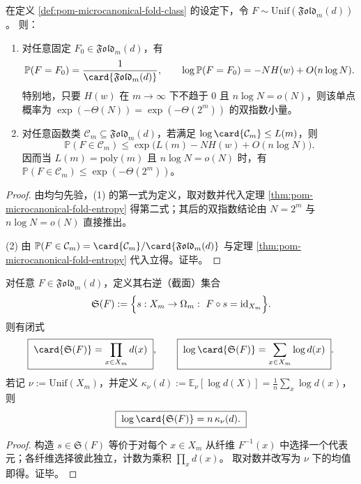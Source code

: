\begin{corollary}[单点稀有性与低复杂度类的双指数稀薄性]\label{cor:pom-microcanonical-fold-singleton-and-low-complexity-rarity}
在定义 \ref{def:pom-microcanonical-fold-class} 的设定下，令 \(F\sim\mathrm{Unif}(\mathfrak{Fold}_m(d))\)。
则：
\begin{enumerate}
  \item 对任意固定 \(F_0\in\mathfrak{Fold}_m(d)\)，有
  \[
  \mathbb P(F=F_0)=\frac{1}{\card{\mathfrak{Fold}_m(d)}},
  \qquad
  \log\mathbb P(F=F_0)=-N H(w)+O(n\log N).
  \]
  特别地，只要 \(H(w)\) 在 \(m\to\infty\) 下不趋于 \(0\) 且 \(n\log N=o(N)\)，则该单点概率为 \(\exp(-\Theta(N))=\exp(-\Theta(2^m))\) 的双指数小量。
  \item 对任意函数类 \(\mathcal C_m\subseteq\mathfrak{Fold}_m(d)\)，若满足 \(\log\card{\mathcal C_m}\le L(m)\)，则
  \[
  \mathbb P(F\in\mathcal C_m)\le \exp\!\bigl(L(m)-N H(w)+O(n\log N)\bigr).
  \]
  因而当 \(L(m)=\mathrm{poly}(m)\) 且 \(n\log N=o(N)\) 时，有 \(\mathbb P(F\in\mathcal C_m)\le \exp(-\Theta(2^m))\)。
\end{enumerate}
\end{corollary}
\begin{proof}
由均匀先验，(1) 的第一式为定义，取对数并代入定理 \ref{thm:pom-microcanonical-fold-entropy} 得第二式；其后的双指数结论由 \(N=2^m\) 与 \(n\log N=o(N)\) 直接推出。
\par
(2) 由 \(\mathbb P(F\in\mathcal C_m)=\card{\mathcal C_m}/\card{\mathfrak{Fold}_m(d)}\) 与定理 \ref{thm:pom-microcanonical-fold-entropy} 代入立得。证毕。
\end{proof}



\begin{theorem}\label{thm:pom-microcanonical-section-count}
对任意 \(F\in\mathfrak{Fold}_m(d)\)，定义其右逆（截面）集合
\[
\mathfrak{S}(F):=\Bigl\{s:X_m\to \Omega_m:\ F\circ s=\mathrm{id}_{X_m}\Bigr\}.
\]
则有闭式
\[
\boxed{\;
\card{\mathfrak{S}(F)}=\prod_{x\in X_m} d(x)\; } ,
\qquad
\boxed{\;
\log\card{\mathfrak{S}(F)}=\sum_{x\in X_m}\log d(x)\; } .
\]
若记 \(\nu:=\mathrm{Unif}(X_m)\)，并定义
\(
\kappa_\nu(d):=\mathbb{E}_{\nu}[\log d(X)]=\frac{1}{n}\sum_x\log d(x)
\)，则
\[
\boxed{\;
\log\card{\mathfrak{S}(F)}=n\,\kappa_\nu(d).\;}
\]
\end{theorem}
\begin{proof}
构造 \(s\in\mathfrak{S}(F)\) 等价于对每个 \(x\in X_m\) 从纤维 \(F^{-1}(x)\) 中选择一个代表元；各纤维选择彼此独立，计数为乘积 \(\prod_x d(x)\)。
取对数并改写为 \(\nu\) 下的均值即得。证毕。
\end{proof}

